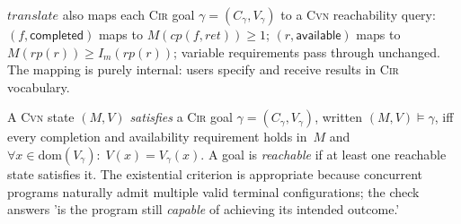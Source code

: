 $\mathit{translate}$ also maps each \textsc{Cir} goal $\gamma=(C_\gamma,V_\gamma)$ to a \textsc{Cvn} reachability query: $(f,\textsf{completed})$ maps to $M(\mathit{cp}(f,\mathit{ret}))\geq 1$; $(r,\textsf{available})$ maps to $M(\mathit{rp}(r))\geq I_m(\mathit{rp}(r))$; variable requirements pass through unchanged. The mapping is purely internal: users specify and receive results in \textsc{Cir} vocabulary.

\begin{definition}
\label{def:goal-sat}
A \textsc{Cvn} state $(M,V)$ \emph{satisfies} a \textsc{Cir} goal $\gamma=(C_\gamma,V_\gamma)$, written $(M,V)\models\gamma$, iff every completion and availability requirement holds in~$M$ and $\forall x\in\mathrm{dom}(V_\gamma):\;V(x)=V_\gamma(x)$.
A goal is \emph{reachable} if at least one reachable state satisfies it. The existential criterion is appropriate because concurrent programs naturally admit multiple valid terminal configurations; the check answers 'is the program still \emph{capable} of achieving its intended outcome.'
\end{definition}
